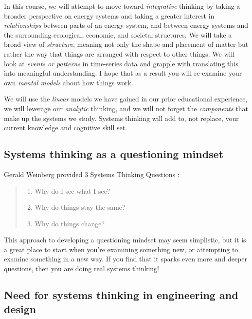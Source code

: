 \documentclass[10pt]{article}
\begin{document}
In this course, we will attempt to move toward \textit{integrative} thinking by taking a broader perspective on energy systems and taking a greater interest in \textit{relationships} between parts of an energy system, and between energy systems and the surrounding ecological, economic, and societal structures. We will take a broad view of \textit{structure}, meaning not only the shape and placement of matter but rather the way that things are arranged with respect to other things. We will look at \textit{events or patterns} in time-series data and grapple with translating this into meaningful understanding. I hope that as a result you will re-examine your own \textit{mental models} about how things work. 

We will use the \textit{linear} models we have gained in our prior educational experience, we will leverage our \textit{analytic} thinking, and we will not forget the \textit{components} that make up the systems we study. Systems thinking will add to, not replace, your current knowledge and cognitive skill set.

\subsection{Systems thinking as a questioning mindset}

Gerald Weinberg provided 3 Systems Thinking Questions \cite{Weinberg_Gerald1975-nc}:

\begin{quote}

\begin{enumerate}
    \item Why do I see what I see?
    \item Why do things stay the same?
    \item Why do things change?
\end{enumerate}
    
\end{quote}

This approach to developing a questioning mindset may seem simplistic, but it is a great place to start when you're examining something new, or attempting to examine something in a new way. If you find that it sparks even more and deeper questions, then you are doing real systems thinking!

\subsection{Need for systems thinking in engineering and design}
\end{document}
